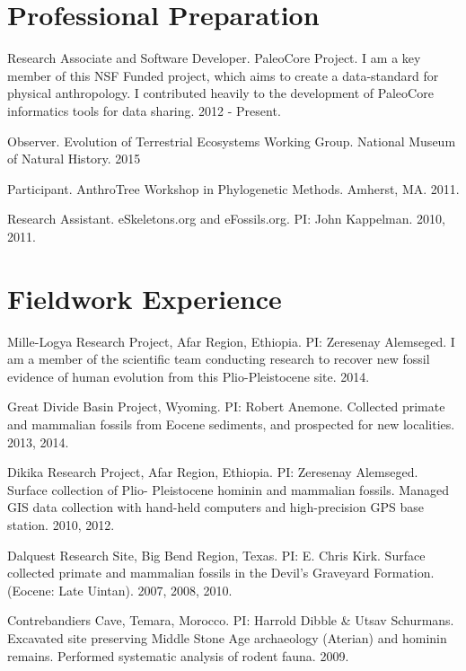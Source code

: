 \documentclass{article}
\begin{document}
\section*{Professional Preparation}
\begin{description*}

\item[] Research Associate and Software Developer. PaleoCore Project. I am a key member of this NSF Funded project, which aims to create a data-standard for physical anthropology. I contributed heavily to the development of PaleoCore informatics tools for data sharing. 2012 - Present.

\item[] Observer. Evolution of Terrestrial Ecosystems Working Group. National Museum of Natural History. 2015

\item[] Participant. AnthroTree Workshop in Phylogenetic Methods. Amherst, MA. 2011.

\item[] Research Assistant. eSkeletons.org and eFossils.org. PI: John Kappelman. 2010, 2011.

\end{description*}


\section*{Fieldwork Experience}
\begin{description*}
\item[] Mille-Logya Research Project, Afar Region, Ethiopia. PI: Zeresenay Alemseged. I am a member of the scientific team conducting research to recover new fossil evidence of human evolution from this Plio-Pleistocene site. 2014.

\item[] Great Divide Basin Project, Wyoming. PI: Robert Anemone. Collected primate and mammalian fossils from Eocene sediments, and prospected for new localities. 2013, 2014.

\item[] Dikika Research Project, Afar Region, Ethiopia. PI: Zeresenay Alemseged. Surface collection of Plio- Pleistocene hominin and mammalian fossils. Managed GIS data collection with hand-held computers and high-precision GPS base station. 2010, 2012.

\item[] Dalquest Research Site, Big Bend Region, Texas. PI: E. Chris Kirk. Surface collected primate and mammalian fossils in the Devil's Graveyard Formation. (Eocene: Late Uintan). 2007, 2008, 2010.

\item[] Contrebandiers Cave, Temara, Morocco. PI: Harrold Dibble \& Utsav Schurmans. Excavated site preserving Middle Stone Age archaeology (Aterian) and hominin remains. Performed systematic analysis of rodent fauna. 2009.
\end{description*}
\end{document}
